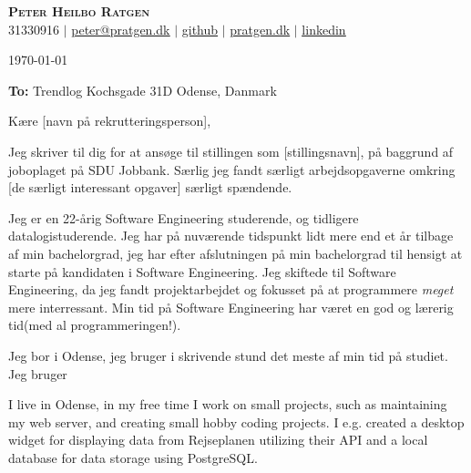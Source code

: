 \documentclass{article}
\begin{document}
\begin{center}
  \textbf{\huge{\scshape{Peter Heilbo Ratgen}}}\\ 
  \vspace{0.2cm}
  \small 31330916 $|$
  \href{mailto:peter@pratgen.dk}{\underline{peter@pratgen.dk}} $|$
  \href{https://github.com/PeterRatgen }{\underline{github}} $|$
  \href{https://pratgen.dk}{\underline{pratgen.dk}} $|$
  \href{https://www.linkedin.com/in/peter-ratgen-a1236529/}{\underline{linkedin}}
\end{center}
\vspace{0.5cm}

\begin{flushright}
  \today
\end{flushright}
\begin{flushleft}
\textbf{To:}\newline
Trendlog\newline
Kochsgade 31D  Odense, Danmark 
\end{flushleft}
\vspace{0.5cm}

Kære [navn på rekrutteringsperson], \vspace{\baselineskip}

Jeg skriver til dig for at ansøge til stillingen som [stillingsnavn], på
baggrund af joboplaget på SDU Jobbank. Særlig jeg fandt særligt arbejdsopgaverne
omkring [de særligt interessant opgaver] særligt spændende. \vspace{\baselineskip}

Jeg er en 22-årig Software Engineering studerende, og tidligere
datalogistuderende. Jeg har på nuværende tidspunkt lidt mere end et år tilbage
af min bachelorgrad, jeg har efter afslutningen på min bachelorgrad til hensigt
at starte på kandidaten i Software Engineering. Jeg skiftede til Software
Engineering, da jeg fandt projektarbejdet og fokusset på at programmere
\textit{meget} mere interressant. Min tid på Software Engineering har været
en god og lærerig tid(med al programmeringen!).\vspace{\baselineskip}

Jeg bor i Odense, jeg bruger i skrivende stund det meste af min tid på studiet.
Jeg bruger 

I live in Odense, in my free time I work on small projects, such as maintaining
my web server, and creating small hobby coding projects. I e.g. created a desktop
widget for displaying data from Rejseplanen utilizing their API and a local
database for data storage using PostgreSQL.\vspace{\baselineskip}
\end{document}
